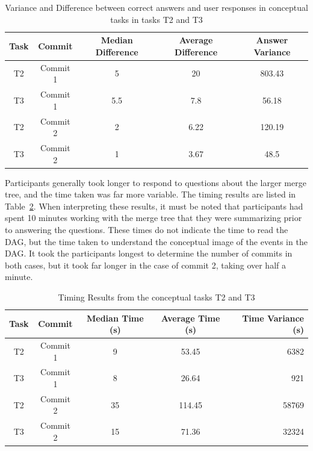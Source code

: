 \begin{table}[htpb]
  \centering
  \caption{Variance and Difference between correct answers and user
    responses in conceptual tasks in tasks T2 and T3}
  \label{tab:conceptual_results}
  \begin{tabular}{ccccc}
    \toprule
    Task & Commit   & Median Difference & Average Difference & Answer Variance\\\midrule
    T2   & Commit 1 & 5                 & 20                 & 803.43\\
    T3   & Commit 1 & 5.5               & 7.8                & 56.18\\
    T2   & Commit 2 & 2                 & 6.22               & 120.19\\
    T3   & Commit 2 & 1                 & 3.67               & 48.5\\
    \bottomrule
  \end{tabular}
\end{table}

Participants generally took longer to respond to questions about the
larger merge tree, and the time taken was far more variable. The timing
results are listed in Table~\ref{tab:conceptual_time_results}. When
interpreting these results, it must be noted that participants had spent
10 minutes working with the merge tree that they were summarizing prior
to answering the questions. These times do not indicate the time to read
the DAG, but the time taken to understand the conceptual image of the
events in the DAG. It took the participants longest to determine the
number of commits in both cases, but it took far longer in the case of
commit 2, taking over half a minute.

\begin{table}[htpb]
  \centering
  \caption{Timing Results from the conceptual tasks T2 and T3}
  \label{tab:conceptual_time_results}
  \begin{tabular}{ccccr}
    \toprule
    Task & Commit   & Median Time (s) & Average Time (s) & Time Variance (s)\\\midrule
    T2   & Commit 1 & 9               & 53.45            & 6382\\
    T3   & Commit 1 & 8               & 26.64            & 921\\
    T2   & Commit 2 & 35              & 114.45           & 58769\\
    T3   & Commit 2 & 15              & 71.36            & 32324\\
    \bottomrule
  \end{tabular}
\end{table}


